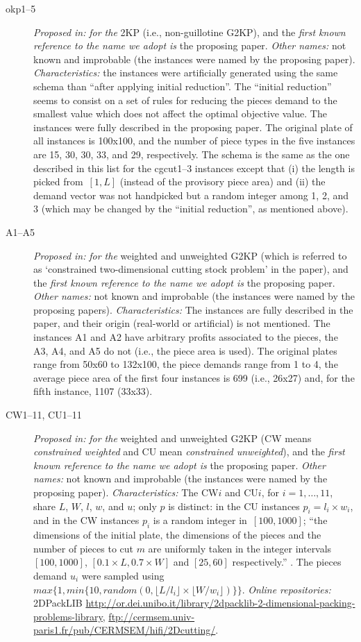 \documentclass[ppgc,prop-tese,english,formais,babel]{iiufrgs}
\begin{document}
\begin{description}
\item [okp1--5] \emph{Proposed in:} \citet{fekete:1997} \emph{for the} 2KP (i.e., non-guillotine G2KP), and the \emph{first known reference to the name we adopt is} the proposing paper. \emph{Other names:} not known and improbable (the instances were named by the proposing paper). \emph{Characteristics: } the instances were artificially generated using the same schema than \citet{beasley:1985:nonguillotine} ``after applying initial reduction''. The ``initial reduction'' seems to consist on a set of rules for reducing the pieces demand to the smallest value which does not affect the optimal objective value. The instances were fully described in the proposing paper. The original plate of all instances is 100x100, and the number of piece types in the five instances are 15, 30, 30, 33, and 29, respectively. The schema is the same as the one described in this list for the cgcut1--3 instances except that (i) the length is picked from~\([1, L]\) (instead of the provisory piece area) and (ii) the demand vector was not handpicked but a random integer among 1, 2, and 3 (which may be changed by the ``initial reduction'', as mentioned above).
\item [A1--A5] \emph{Proposed in:} \citet{hifi:1997} \emph{for the} weighted and unweighted G2KP (which is referred to as `constrained two-dimensional cutting stock problem' in the paper), and the \emph{first known reference to the name we adopt is} the proposing paper. \emph{Other names:} not known and improbable (the instances were named by the proposing papers). \emph{Characteristics: } The instances are fully described in the paper, and their origin (real-world or artificial) is not mentioned. The instances A1 and A2 have arbitrary profits associated to the pieces, the A3, A4, and A5 do not (i.e., the piece area is used). The original plates range from 50x60 to 132x100, the piece demands range from 1 to 4, the average piece area of the first four instances is 699 (i.e., 26x27) and, for the fifth instance, 1107 (33x33).
\item [CW1--11, CU1--11] \emph{Proposed in:} \citet{fayard:1998} \emph{for the} weighted and unweighted G2KP (CW means \emph{constrained weighted} and CU mean \emph{constrained unweighted}), and the \emph{first known reference to the name we adopt is} the proposing paper. \emph{Other names:} not known and improbable (the instances were named by the proposing paper). \emph{Characteristics: } The CW\(i\) and CU\(i\), for \(i = 1, \dots, 11\), share \(L\), \(W\), \(l\), \(w\), and \(u\); only \(p\) is distinct: in the CU instances \(p_i = l_i \times w_i\), and in the CW instances \(p_i\) is a random integer in~\([100, 1000]\); ``the dimensions of the initial plate, the dimensions of the pieces and the number of pieces to cut \(m\) are uniformly taken in the integer intervals \([100, 1000]\), \([0.1 \times L, 0.7 \times W]\) and \([25, 60]\) respectively.'' \citep{fayard:1998}. The pieces demand \(u_i\) were sampled using~\(max\{1, min\{10, random(0, \lfloor L/l_i \rfloor \times \lfloor W/w_i \rfloor)\}\}\). \emph{Online repositories:} 2DPackLIB \url{http://or.dei.unibo.it/library/2dpacklib-2-dimensional-packing-problems-library}, \url{ftp://cermsem.univ-paris1.fr/pub/CERMSEM/hifi/2Dcutting/}.

\end{description}
\end{document}

